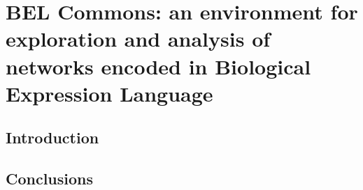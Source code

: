 
\chapter{BEL Commons: an environment for exploration and analysis of networks encoded in Biological Expression Language}\label{chap:belcommons}

\section*{Introduction}

\vspace*{\fill}



\section*{Conclusions}
